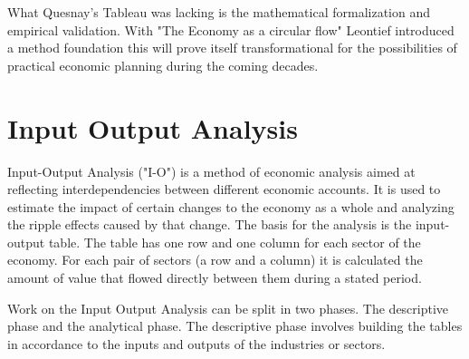 \documentclass[12pt,a4paper]{scrartcl}
\begin{document}
	What Quesnay's Tableau was lacking is the mathematical formalization and empirical validation. With "The Economy as a circular flow" \cite[]{Leontief1991} Leontief introduced a method foundation this will prove itself transformational for the possibilities of practical economic planning during the coming decades.
	
	
	
	
		
	
	\section{Input Output Analysis} \label{analysis}

	Input-Output Analysis ("I-O") is a method of economic analysis aimed at reflecting interdependencies between different economic accounts. It is used to estimate the impact of certain changes to the economy as a whole and analyzing the ripple effects caused by that change. The basis for the analysis is the input-output table. The table has one row and one column for each sector of the economy. For each pair of sectors (a row and a column) it is calculated the amount of value that flowed directly between them during a stated period.
	
	Work on the Input Output Analysis can be split in two phases. The descriptive phase and the analytical phase. The descriptive phase involves building the tables in accordance to the inputs and outputs of the industries or sectors.
	
\end{document}
